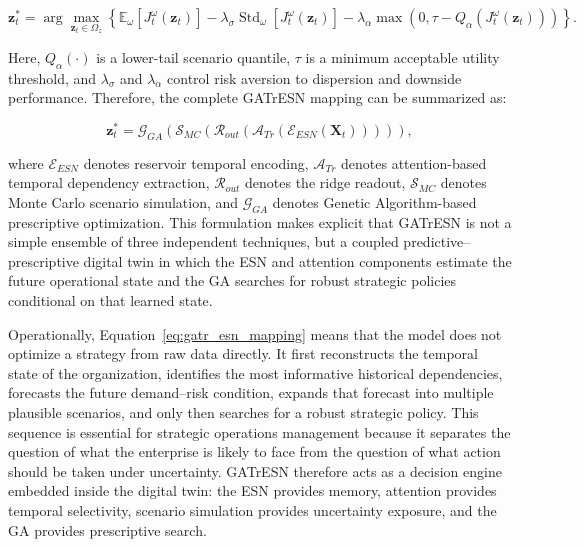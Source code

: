 \documentclass[apajournal,article,submit,pdftex,moreauthors]{Definitions/mdpi}
\begin{document}
\begin{linenomath}
\begin{equation}
\mathbf{z}_{t}^{*}
=
\arg\max_{\mathbf{z}_t\in\Omega_z}
\left\{
\mathbb{E}_{\omega}
\left[
J_{t}^{\omega}(\mathbf{z}_t)
\right]
-
\lambda_{\sigma}
\operatorname{Std}_{\omega}
\left[
J_{t}^{\omega}(\mathbf{z}_t)
\right]
-
\lambda_{\alpha}
\max
\left(
0,\tau-Q_{\alpha}
\left(
J_{t}^{\omega}(\mathbf{z}_t)
\right)
\right)
\right\}.
\label{eq:robust_ga_objective}
\end{equation}
\end{linenomath}
Here, $Q_{\alpha}(\cdot)$ is a lower-tail scenario quantile, $\tau$ is a minimum acceptable utility threshold, and $\lambda_{\sigma}$ and $\lambda_{\alpha}$ control risk aversion to dispersion and downside performance. Therefore, the complete GATrESN mapping can be summarized as:

\begin{linenomath}
\begin{equation}
\mathbf{z}_{t}^{*}
=
\mathcal{G}_{GA}
\left(
\mathcal{S}_{MC}
\left(
\mathcal{R}_{out}
\left(
\mathcal{A}_{Tr}
\left(
\mathcal{E}_{ESN}(\mathbf{X}_t)
\right)
\right)
\right)
\right),
\label{eq:gatr_esn_mapping}
\end{equation}
\end{linenomath}
where $\mathcal{E}_{ESN}$ denotes reservoir temporal encoding, $\mathcal{A}_{Tr}$ denotes attention-based temporal dependency extraction, $\mathcal{R}_{out}$ denotes the ridge readout, $\mathcal{S}_{MC}$ denotes Monte Carlo scenario simulation, and $\mathcal{G}_{GA}$ denotes Genetic Algorithm-based prescriptive optimization. This formulation makes explicit that GATrESN is not a simple ensemble of three independent techniques, but a coupled predictive--prescriptive digital twin in which the ESN and attention components estimate the future operational state and the GA searches for robust strategic policies conditional on that learned state.

Operationally, Equation~\eqref{eq:gatr_esn_mapping} means that the model does not optimize a strategy from raw data directly. It first reconstructs the temporal state of the organization, identifies the most informative historical dependencies, forecasts the future demand--risk condition, expands that forecast into multiple plausible scenarios, and only then searches for a robust strategic policy. This sequence is essential for strategic operations management because it separates the question of what the enterprise is likely to face from the question of what action should be taken under uncertainty. GATrESN therefore acts as a decision engine embedded inside the digital twin: the ESN provides memory, attention provides temporal selectivity, scenario simulation provides uncertainty exposure, and the GA provides prescriptive search.
\end{document}
